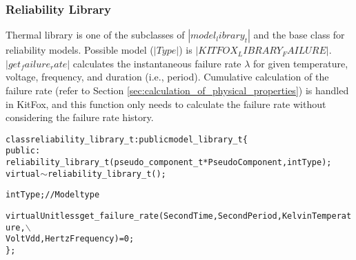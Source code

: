 \subsubsection{Reliability Library}
\noindent
Thermal library is one of the subclasses of $|model_library_t|$ and the base class for reliability models. 
Possible model ($|Type|$) is $|KITFOX_LIBRARY_FAILURE|$. 
$|get_failure_rate|$ calculates the instantaneous failure rate $\lambda$ for given temperature, voltage, frequency, and duration (i.e., period). 
Cumulative calculation of the failure rate (refer to Section \ref{sec:calculation_of_physical_properties}) is handled in KitFox, and this function only needs to calculate the failure rate without considering the failure rate history.
{
\fontsize{10pt}{11pt}\selectfont
\begin{alltt}
class reliability_library_t : public model_library_t \{
public:
    reliability_library_t(pseudo_component_t *PseudoComponent, int Type);
    virtual \(\sim\)reliability_library_t();
    
    int Type; // Model type
    
    virtual Unitless get_failure_rate(Second Time, Second Period, Kelvin Temperature,\(\backslash\)
    Volt Vdd, Hertz Frequency) = 0;
\};
\end{alltt}
}

